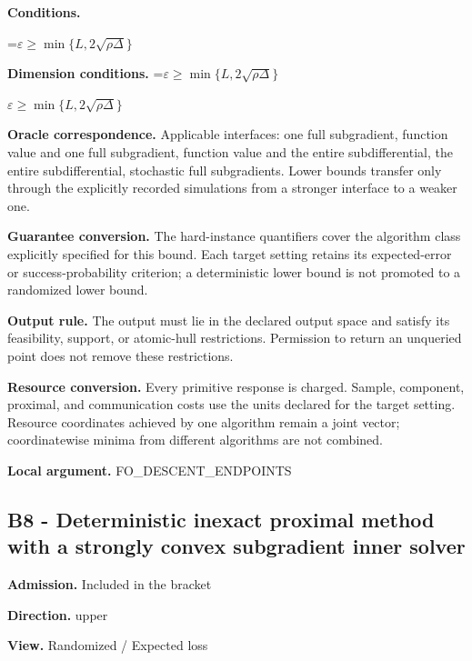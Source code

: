 \documentclass[10pt,a4paper]{article}
\newcommand{\AtlasMath}[1]{\par\begingroup\centering\setbox0=\hbox{$\displaystyle #1$}\ifdim\wd0>1.4\linewidth\typeout{ATLAS WIDE FORMULA: \the\wd0}\fi\ifdim\wd0>\linewidth\resizebox{\linewidth}{!}{\box0}\else\box0\fi\par\endgroup}
\newcommand{\AtlasInlineMath}[1]{\begingroup\setbox0=\hbox{$#1$}\ifdim\wd0>.4\linewidth\endgroup\AtlasMath{#1}\else\endgroup$#1$\fi}
\begin{document}
\textbf{Conditions.}
\AtlasMath{\varepsilon\ge\min\{L,2\sqrt{\rho\Delta}\}}




\textbf{Dimension conditions.} \AtlasInlineMath{\varepsilon\ge\min\{L,2\sqrt{\rho\Delta}\}}



\textbf{Oracle correspondence.} Applicable interfaces: one full subgradient, function value and one full subgradient, function value and the entire subdifferential, the entire subdifferential, stochastic full subgradients. Lower bounds transfer only through the explicitly recorded simulations from a stronger interface to a weaker one.



\textbf{Guarantee conversion.} The hard-instance quantifiers cover the algorithm class explicitly specified for this bound. Each target setting retains its expected-error or success-probability criterion; a deterministic lower bound is not promoted to a randomized lower bound.



\textbf{Output rule.} The output must lie in the declared output space and satisfy its feasibility, support, or atomic-hull restrictions. Permission to return an unqueried point does not remove these restrictions.



\textbf{Resource conversion.} Every primitive response is charged. Sample, component, proximal, and communication costs use the units declared for the target setting. Resource coordinates achieved by one algorithm remain a joint vector; coordinatewise minima from different algorithms are not combined.



\textbf{Local argument.} FO\_DESCENT\_ENDPOINTS



\subsection{B8 - Deterministic inexact proximal method with a strongly convex subgradient inner solver}


\textbf{Admission.} Included in the bracket



\textbf{Direction.} upper



\textbf{View.} Randomized / Expected loss
\end{document}
